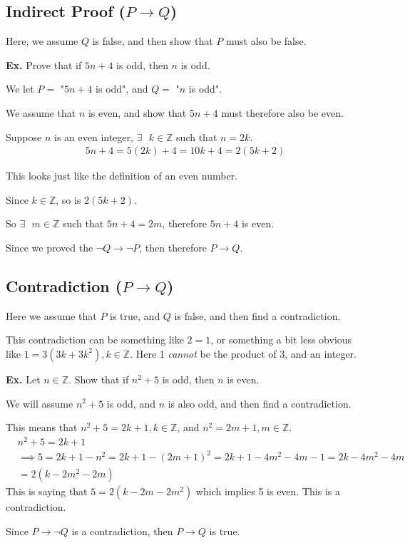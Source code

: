 \documentclass[12pt,letterpaper]{article} \usepackage{amsmath} \usepackage{graphicx}  \usepackage{longtable}  \usepackage{amssymb}
\begin{document}
        \subsection{Indirect Proof ($P \rightarrow Q$)}
        Here, we assume $Q$ is false, and then show that $P$ must also be false.

        \begin{mdframed}
            \textbf{Ex. } Prove that if $5n+4$ is odd, then $n$ is odd.

            We let $P = $ "$5n+4$ is odd", and $Q=$ "$n$ is odd".

            We assume that $n$ is even, and show that $5n+4$ must therefore also be even.

            Suppose $n$ is an even integer, $\exists \text{ } k\in\mathbb{Z}$ such that $n=2k$.
            \begin{align*}
                5n+4 = 5(2k)+4 = 10k+4 = 2(5k+2)
            \end{align*}

            This looks just like the definition of an even number.

            Since $k\in\mathbb{Z}$, so is $2(5k+2)$.

            So $\exists \text{ } m\in\mathbb{Z}$ such that $5n+4=2m$, therefore $5n+4$ is even.

            Since we proved the $\lnot Q \rightarrow \lnot P$, then therefore $P\rightarrow Q$.
        \end{mdframed}

        \subsection{Contradiction ($P \rightarrow Q$)}
        Here we assume that $P$ is true, and $Q$ is false, and then find a contradiction. 

        This contradiction can be something like $2=1$, or something a bit less obvious like $1=3(3k+3k^2), k\in\mathbb{Z}$. Here 1 \emph{cannot} be the product of 3, and an integer. 

        \begin{mdframed}
            \textbf{Ex. } Let $n\in \mathbb{Z}$. Show that if $n^2+5$ is odd, then $n$ is even. 

            We will assume $n^2+5$ is odd, and $n$ is also odd, and then find a contradiction. 

            This means that $n^2 + 5 = 2k+1, k\in\mathbb{Z}$, and $n^2 = 2m+1, m\in\mathbb{Z}$.
            \begin{align*}
                &n^2 + 5 = 2k+1 \\
                &\implies 5 = 2k+1-n^2 = 2k+1-(2m+1)^2 = 2k+1-4m^2-4m-1 = 2k-4m^2-4m\\
                &= 2(k-2m^2-2m)
            \end{align*}
            This is saying that $5=2(k-2m-2m^2)$ which implies 5 is even. This is a contradiction. 

            Since $P\rightarrow \lnot Q$ is a contradiction, then $P\rightarrow Q$ is true. 
        \end{mdframed}
\end{document}
